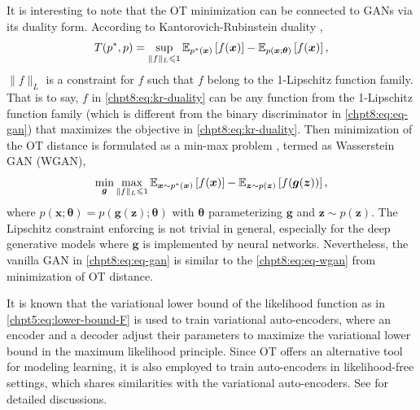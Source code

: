 \begin{remark}\label{chpt8:rmk:wgan}
  It is interesting to note that the OT minimization can be connected to GANs via its duality form. According to Kantorovich-Rubinstein duality \cite[Section~2.4]{2018arXiv180300567P}\cite{villani2008optimal},
  \begin{equation}\label{chpt8:eq:kr-duality}
     T(p^{\ast},p) = \sup_{\|f\|_{L} \leqslant 1} \mathbb{E}_{p^{\ast}(\bm{x})}\left[ f(\bm{x}) \right] -
  \mathbb{E}_{p(\bm{x};\bm{\theta})}\left[ f(\bm{x}) \right],
\end{equation}
$\|f\|_L$ is a constraint for $f$ such that $f$ belong to the 1-Lipschitz function
family. That is to say, $f$ in \eqref{chpt8:eq:kr-duality} can be any function from the 1-Lipschitz function
family (which is different from the binary discriminator in \eqref{chpt8:eq:eq-gan}) that maximizes the objective in \eqref{chpt8:eq:kr-duality}. Then minimization of the OT distance is formulated as a min-max problem \cite{2017arXiv170107875A}, termed as Wasserstein GAN (WGAN),
\begin{equation}\label{chpt8:eq:eq-wgan}
  \min_{\bm{g}} \max_{\|f\|_{L} \leqslant 1} \mathbb{E}_{\bm{x} \sim p^{\ast}(\bm{x})}\left[ f(\bm{x}) \right] -
  \mathbb{E}_{\bm{z}\sim p(\bm{z})}\left[ f(\bm{g}(\bm{z})) \right],
\end{equation}
where $p(\bm{x};\bm{\theta}) = p(\bm{g}(\bm{z}); \bm{\theta})$ with $\bm{\theta}$ parameterizing $\bm{g}$ and $\bm{z}\sim p(\bm{z})$. The  Lipschitz constraint enforcing is not trivial in general, especially for the deep generative models where $\bm{g}$ is implemented by neural networks. Nevertheless, the vanilla GAN in \eqref{chpt8:eq:eq-gan} is similar to the \eqref{chpt8:eq:eq-wgan} from minimization of OT distance.
\end{remark}

\begin{remark}
It is known that the variational lower bound of the likelihood function as in \eqref{chpt5:eq:lower-bound-F} is used to train variational auto-encoders, where an encoder and a decoder adjust their parameters to maximize the variational lower bound in the maximum likelihood principle. Since OT offers an alternative tool for modeling learning, it is also employed to train auto-encoders in likelihood-free settings, which shares similarities with the variational auto-encoders. See \cite{patrini2018sinkhornVAE, genevay2017gan,bousquet2017optimal, ambrogioni2018wasserstein} for detailed discussions.
\end{remark}


